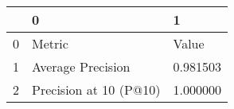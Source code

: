 \begin{tabular}{lll}
\toprule
 & 0 & 1 \\
\midrule
0 & Metric & Value \\
1 & Average Precision & 0.981503 \\
2 & Precision at 10 (P@10) & 1.000000 \\
\bottomrule
\end{tabular}

